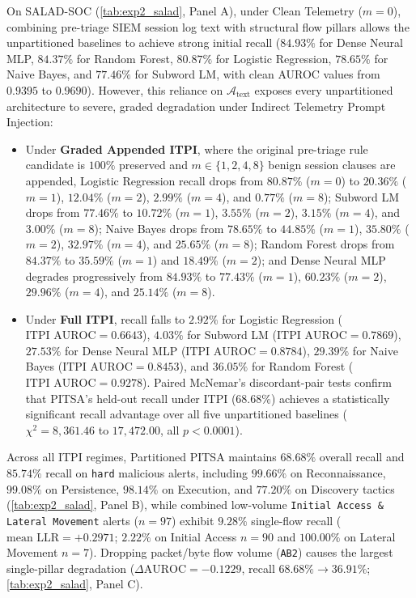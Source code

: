 \documentclass[11pt,a4paper]{article}
\let\oldtexttt\texttt
\renewcommand{\texttt}[1]{\textnormal{\oldtexttt{#1}}}
\begin{document}
On SALAD-SOC (\cref{tab:exp2_salad}, Panel A), under Clean Telemetry ($m=0$), combining pre-triage SIEM session log text with structural flow pillars allows the unpartitioned baselines to achieve strong initial recall ($84.93\%$ for Dense Neural MLP, $84.37\%$ for Random Forest, $80.87\%$ for Logistic Regression, $78.65\%$ for Naive Bayes, and $77.46\%$ for Subword LM, with clean AUROC values from $0.9395$ to $0.9690$). However, this reliance on $\mathcal{A}_{\text{text}}$ exposes every unpartitioned architecture to severe, graded degradation under Indirect Telemetry Prompt Injection:
\begin{itemize}
  \item Under \textbf{Graded Appended ITPI}, where the original pre-triage rule candidate is $100\%$ preserved and $m \in \{1, 2, 4, 8\}$ benign session clauses are appended, Logistic Regression recall drops from $80.87\%$ ($m=0$) to $20.36\%$ ($m=1$), $12.04\%$ ($m=2$), $2.99\%$ ($m=4$), and $0.77\%$ ($m=8$); Subword LM drops from $77.46\%$ to $10.72\%$ ($m=1$), $3.55\%$ ($m=2$), $3.15\%$ ($m=4$), and $3.00\%$ ($m=8$); Naive Bayes drops from $78.65\%$ to $44.85\%$ ($m=1$), $35.80\%$ ($m=2$), $32.97\%$ ($m=4$), and $25.65\%$ ($m=8$); Random Forest drops from $84.37\%$ to $35.59\%$ ($m=1$) and $18.49\%$ ($m=2$); and Dense Neural MLP degrades progressively from $84.93\%$ to $77.43\%$ ($m=1$), $60.23\%$ ($m=2$), $29.96\%$ ($m=4$), and $25.14\%$ ($m=8$).
  \item Under \textbf{Full ITPI}, recall falls to $2.92\%$ for Logistic Regression ($\text{ITPI AUROC} = 0.6643$), $4.03\%$ for Subword LM ($\text{ITPI AUROC} = 0.7869$), $27.53\%$ for Dense Neural MLP ($\text{ITPI AUROC} = 0.8784$), $29.39\%$ for Naive Bayes ($\text{ITPI AUROC} = 0.8453$), and $36.05\%$ for Random Forest ($\text{ITPI AUROC} = 0.9278$). Paired McNemar's discordant-pair tests confirm that PITSA's held-out recall under ITPI ($68.68\%$) achieves a statistically significant recall advantage over all five unpartitioned baselines ($\chi^2 = 8,361.46$ to $17,472.00$, all $p < 0.0001$).
\end{itemize}
Across all ITPI regimes, Partitioned PITSA maintains $68.68\%$ overall recall and $85.74\%$ recall on \texttt{hard} malicious alerts, including $99.66\%$ on Reconnaissance, $99.08\%$ on Persistence, $98.14\%$ on Execution, and $77.20\%$ on Discovery tactics (\cref{tab:exp2_salad}, Panel B), while combined low-volume \texttt{Initial Access \& Lateral Movement} alerts ($n=97$) exhibit $9.28\%$ single-flow recall ($\text{mean LLR} = +0.2971$; $2.22\%$ on Initial Access $n=90$ and $100.00\%$ on Lateral Movement $n=7$). Dropping packet/byte flow volume (\texttt{AB2}) causes the largest single-pillar degradation ($\Delta \text{AUROC} = -0.1229$, recall $68.68\% \to 36.91\%$; \cref{tab:exp2_salad}, Panel C).
\end{document}
